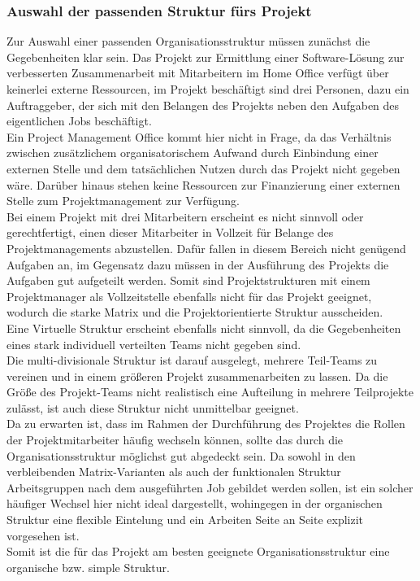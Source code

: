 \documentclass[ThesisDJ.tex]{subfiles}
\begin{document}
\subsubsection{Auswahl der passenden Struktur fürs Projekt}
Zur Auswahl einer passenden Organisationsstruktur müssen zunächst die Gegebenheiten klar sein. Das Projekt zur Ermittlung einer Software-Lösung zur verbesserten Zusammenarbeit mit Mitarbeitern im Home Office verfügt über keinerlei externe Ressourcen, im Projekt beschäftigt sind drei Personen, dazu ein Auftraggeber, der sich mit den Belangen des Projekts neben den Aufgaben des eigentlichen Jobs beschäftigt.\\
Ein Project Management Office kommt hier nicht in Frage, da das Verhältnis zwischen zusätzlichem organisatorischem Aufwand durch Einbindung einer externen Stelle und dem tatsächlichen Nutzen durch das Projekt nicht gegeben wäre. Darüber hinaus stehen keine Ressourcen zur Finanzierung einer externen Stelle zum Projektmanagement zur Verfügung.\\
Bei einem Projekt mit drei Mitarbeitern erscheint es nicht sinnvoll oder gerechtfertigt, einen dieser Mitarbeiter in Vollzeit für Belange des Projektmanagements abzustellen. Dafür fallen in diesem Bereich nicht genügend Aufgaben an, im Gegensatz dazu müssen in der Ausführung des Projekts die Aufgaben gut aufgeteilt werden. Somit sind Projektstrukturen mit einem Projektmanager als Vollzeitstelle ebenfalls nicht für das Projekt geeignet, wodurch die starke Matrix und die Projektorientierte Struktur ausscheiden.\\
Eine Virtuelle Struktur erscheint ebenfalls nicht sinnvoll, da die Gegebenheiten eines stark individuell verteilten Teams nicht gegeben sind.\\
Die multi-divisionale Struktur ist darauf ausgelegt, mehrere Teil-Teams zu vereinen und in einem größeren Projekt zusammenarbeiten zu lassen. Da die Größe des Projekt-Teams nicht realistisch eine Aufteilung in mehrere Teilprojekte zulässt, ist auch diese Struktur nicht unmittelbar geeignet.\\
Da zu erwarten ist, dass im Rahmen der Durchführung des Projektes die Rollen der Projektmitarbeiter häufig wechseln können, sollte das durch die Organisationsstruktur möglichst gut abgedeckt sein. Da sowohl in den verbleibenden Matrix-Varianten als auch der funktionalen Struktur Arbeitsgruppen nach dem ausgeführten Job gebildet werden sollen, ist ein solcher häufiger Wechsel hier nicht ideal dargestellt, wohingegen in der organischen Struktur eine flexible Eintelung und ein Arbeiten Seite an Seite explizit vorgesehen ist.\\
Somit ist die für das Projekt am besten geeignete Organisationsstruktur eine organische bzw. simple Struktur.
\end{document}
